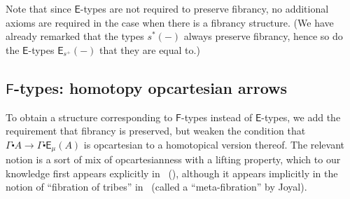 \documentclass[10pt]{article}
\theoremstyle{definition}
\newcommand\Fsym{\ensuremath{\mathsf{F}}}
\newcommand\Esym{\ensuremath{\mathsf{E}}}
\newcommand\E[2]{\ensuremath{\mathsf{E}_{#1}(#2)}}
\newcommand\St[2]{\ensuremath{{#1}^*(#2)}}
\newcommand\TrPlusSym[1]{\ensuremath{{#1}^+}}
\newcommand\ce{\mathord{\centerdot}}
\begin{document}
Note that since $\Esym$-types are not required to preserve fibrancy, no additional axioms are required in the case when there is a fibrancy structure.
(We have already remarked that the types $\St{s}{-}$ always preserve fibrancy, hence so do the $\Esym$-types $\E{\TrPlusSym{s}}{-}$ that they are equal to.)


\subsection{$\Fsym$-types: homotopy opcartesian arrows}
\label{sec:htpy-opcartesian}

To obtain a structure corresponding to $\Fsym$-types instead of $\Esym$-types, we add the requirement that fibrancy is preserved, but weaken the condition that $\Gamma\ce A \to \Gamma \ce \E{\mu}{A}$ is opcartesian to a homotopical version thereof.
The relevant notion is a sort of mix of opcartesianness with a lifting property, which to our knowledge first appears explicitly in~\cite{CagneMellies2019} (), although it appears implicitly in the notion of ``fibration of tribes'' in~\cite{KapulkinSzumilo} (called a ``meta-fibration'' by Joyal).
\end{document}
